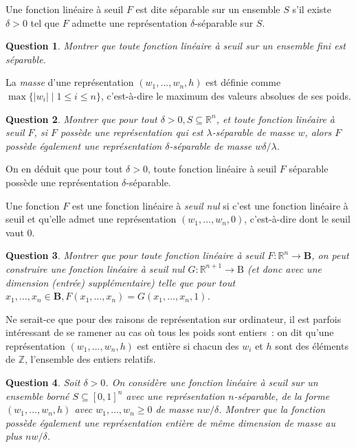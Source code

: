 \documentclass[10pt]{article}
\newtheorem{question}{Question}
\begin{document}
Une fonction linéaire à seuil $F$ est dite séparable sur un ensemble $S$ s'il existe $δ>0$ tel que $F$ admette une représentation $δ$-séparable sur $S$.

\begin{question}
	Montrer que toute fonction linéaire à seuil sur un ensemble fini est séparable.
\end{question}

La \emph{masse} d'une représentation $\left(w_{1}, \ldots, w_{n}, h\right)$ est définie comme $\max\{|w_{i}| \mid 1 ≤ i ≤ n\}$, c'est-à-dire le maximum des valeurs absolues de ses poids.

\begin{question}
	\label{q:lambda-delta-separable}
	Montrer que pour tout $δ>0, S \subseteq ℝ^{n}$, et toute fonction linéaire à seuil $F$, si $F$ possède une représentation qui est $λ$-séparable de masse $w$, alors $F$ possède également une représentation $δ$-séparable de masse $w δ / λ$.
\end{question}

On en déduit que pour tout $δ>0$, toute fonction linéaire à seuil $F$ séparable possède une représentation $δ$-séparable.

Une fonction $F$ est une fonction linéaire à \emph{seuil nul} si c'est une fonction linéaire à seuil et qu'elle admet une représentation $\left(w_{1}, \ldots, w_{n}, 0\right)$, c'est-à-dire dont le seuil vaut $0$.

\begin{question}
	Montrer que pour toute fonction linéaire à seuil $F: ℝ^{n} → \mathbf{B}$, on peut construire une fonction linéaire à seuil nul $G: ℝ^{n+1} → \mathrm{B}$ (et donc avec une dimension (entrée) supplémentaire) telle que pour tout $x_{1}, \ldots, x_{n} \in \mathbf{B}, F\left(x_{1}, \ldots, x_{n}\right)=G\left(x_{1}, \ldots, x_{n}, 1\right)$.
\end{question}

Ne serait-ce que pour des raisons de représentation sur ordinateur, il est parfois intéressant de se ramener au cas où tous les poids sont entiers : on dit qu'une représentation $\left(w_{1}, \ldots, w_{n}, h\right)$ est entière si chacun des $w_{i}$ et $h$ sont des éléments de $ℤ$, l'ensemble des entiers relatifs.

\begin{question}
	Soit $δ>0$. On considère une fonction linéaire à seuil sur un ensemble borné $S \subseteq[0,1]^{n}$ avec une représentation $n$-séparable, de la forme $\left(w_{1}, \ldots, w_{n}, h\right)$ avec $w_{1}, \ldots, w_{n} ≥ 0$ de masse $n w / δ$. Montrer que la fonction possède également une représentation entière de même dimension de masse au plus $n w / δ$.
\end{question}
\end{document}
